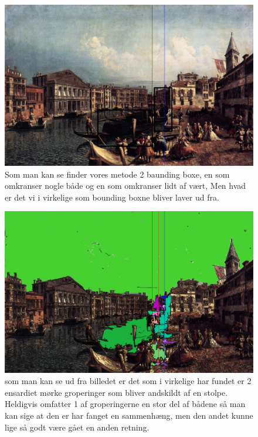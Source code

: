 \begin{figure}[h!!]
	\begin{center}
		\includegraphics[scale=0.40,angle=0]{afsnit/afprovning/billeder/BBcomposa.png}
	\end{center}
	\caption[]{Som man kan se finder vores metode 2 baunding boxe, en
	           som omkranser nogle både og en som omkranser lidt af
	           vært, Men hvad er det vi i virkelige som bounding boxne
	           bliver laver ud fra.}
	\label{BBcomposa}
\end{figure}

\begin{figure}[h!!]
	\begin{center}
		\includegraphics[scale=0.40,angle=0]{afsnit/afprovning/billeder/FFcomposa.png}
	\end{center}
	\caption[]{som man kan se ud fra billedet er det som i virkelige har
	           fundet er 2 ensardiet mørke groperinger som bliver
	           andskildt af en stolpe. Heldigvis omfatter 1 af
	           groperingerne en stor del af bådene så man kan sige at
	           den er har fanget en sammenhæng, men den andet kunne lige
	           så godt være gået en anden retning.}
	\label{FFcomposa}
\end{figure}


